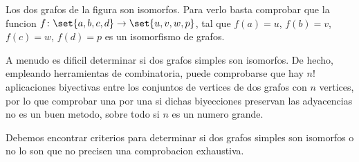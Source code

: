 \begin{example}
	Los dos grafos de la figura son isomorfos. Para verlo basta comprobar que la funcion \(f\colon \set{a,b,c,d} \to \set{u,v,w,p }\), tal que \(f(a) = u \), \(f(b) = v \), \(f(c) = w \), \(f(d) = p \) es un isomorfismo de grafos. 
	
	\begin{center}
	\end{center}
\end{example}

A menudo es dificil determinar si dos grafos simples son isomorfos. De hecho, empleando herramientas de combinatoria, puede comprobarse que hay \(n! \) aplicaciones biyectivas entre los conjuntos de vertices de dos grafos con \(n \) vertices, por lo que comprobar una por una si dichas biyecciones preservan las adyacencias no es un buen metodo, sobre todo si \(n \) es un numero grande.

Debemos encontrar criterios para determinar si dos grafos simples son isomorfos o no lo son que no precisen una comprobacion exhaustiva. 


